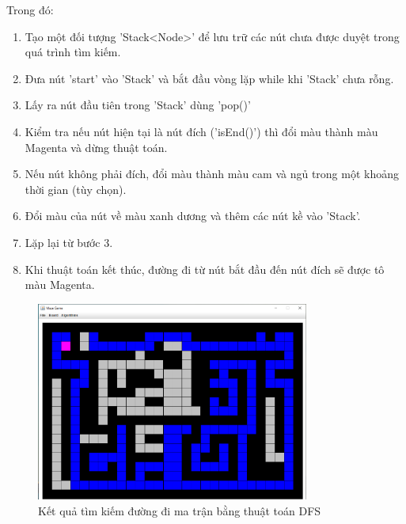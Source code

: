 Trong đó:
\begin{enumerate}
	\item Tạo một đối tượng 'Stack<Node>' để lưu trữ các nút chưa được duyệt trong quá trình tìm kiếm.
	\item Đưa nút 'start' vào 'Stack' và bắt đầu vòng lặp while khi 'Stack' chưa rỗng.
	\item Lấy ra nút đầu tiên trong 'Stack' dùng 'pop()'
	\item Kiểm tra nếu nút hiện tại là nút đích ('isEnd()') thì đổi màu thành màu Magenta và dừng thuật toán.
	
	\item Nếu nút không phải đích, đổi màu thành màu cam và ngủ trong một khoảng thời gian (tùy chọn).
	\item Đổi màu của nút về màu xanh dương và thêm các nút kề vào 'Stack'.
	\item Lặp lại từ bước 3.
	\item Khi thuật toán kết thúc, đường đi từ nút bắt đầu đến nút đích sẽ được tô màu Magenta.
\end{enumerate}

\begin{figure}[h!]
	\centering
	\includegraphics[width=0.8\textwidth]{
		Figures/figs/6.PNG
	}
	\caption[Kết quả tìm kiếm đường đi ma trận bằng thuật toán DFS]{
		Kết quả tìm kiếm đường đi ma trận bằng thuật toán DFS
	}
	\label{fig:hinhl}
\end{figure}

\newpage
